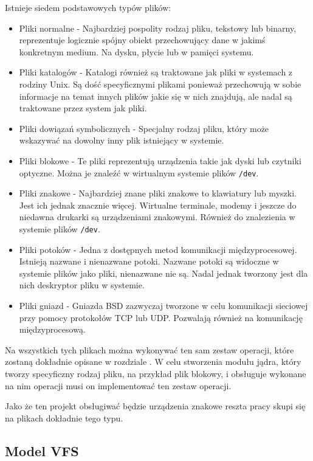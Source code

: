 \documentclass[11pt]{scrartcl}
\begin{document}
Istnieje siedem podstawowych typów plików:

\begin{itemize}
\itemsep1pt\parskip0pt
\item
  Pliki normalne - Najbardziej pospolity rodzaj pliku, tekstowy lub binarny, reprezentuje logicznie spójny obiekt przechowujący dane w jakimś konkretnym medium. Na dysku, płycie lub w pamięci systemu.
\item
  Pliki katalogów - Katalogi również są traktowane jak pliki w systemach z rodziny Unix. Są dość specyficznymi plikami ponieważ przechowują w sobie informacje na temat innych plików jakie się w nich znajdują, ale nadal są traktowane przez system jak pliki.
\item
  Pliki dowiązań symbolicznych - Specjalny rodzaj pliku, który może wskazywać na dowolny inny plik istniejący w systemie.
\item
  Pliki blokowe - Te pliki reprezentują urządzenia takie jak dyski lub czytniki optyczne. Można je znaleźć w wirtualnym systemie plików \texttt{/dev}.
\item
  Pliki znakowe - Najbardziej znane pliki znakowe to klawiatury lub myszki. Jest ich jednak znacznie więcej. Wirtualne terminale, modemy i jeszcze do niedawna drukarki są urządzeniami znakowymi. Również do znalezienia w systemie plików \texttt{/dev}.
\item
  Pliki potoków - Jedna z dostępnych metod komunikacji międzyprocesowej. Istnieją nazwane i nienazwane potoki. Nazwane potoki są widoczne w systemie plików jako pliki, nienazwane nie są. Nadal jednak tworzony jest dla nich deskryptor pliku w systemie.
\item
  Pliki gniazd - Gniazda BSD zazwyczaj tworzone w celu komunikacji sieciowej przy pomocy protokołów TCP lub UDP\@. Pozwalają również na komunikację międzyprocesową.
\end{itemize}

Na wszystkich tych plikach można wykonywać ten sam zestaw operacji, które zostaną dokładnie opisane w rozdziale . W celu stworzenia modułu jądra, który tworzy specyficzny rodzaj pliku, na przykład plik blokowy, i obsługuje wykonane na nim operacji musi on implementować ten zestaw operacji.

Jako że ten projekt obsługiwać będzie urządzenia znakowe reszta pracy skupi się na plikach dokładnie tego typu.

\subsection{Model VFS}
\label{vfs}
\end{document}
